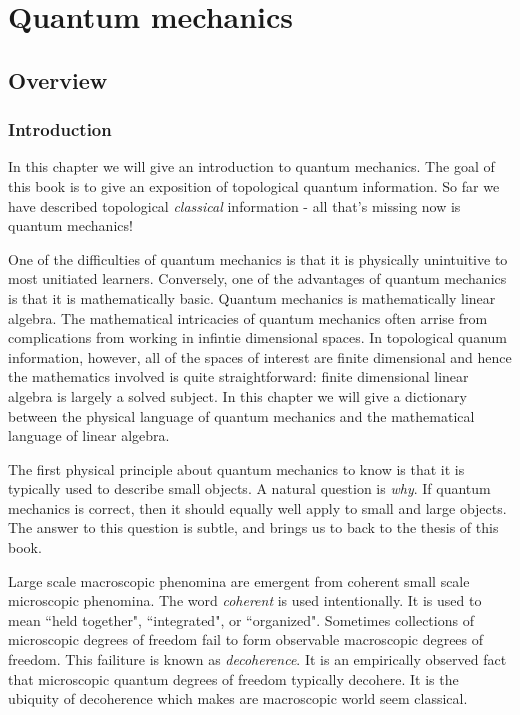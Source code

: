 \section{Quantum mechanics}
\label{quantum-mechanics}

\subsection{Overview}

\subsubsection{Introduction}

In this chapter we will give an introduction to quantum mechanics. The goal of this book is to give an exposition of topological quantum information. So far we have described topological {\em classical} information - all that's missing now is quantum mechanics!

One of the difficulties of quantum mechanics is that it is physically unintuitive to most unitiated learners. Conversely, one of the advantages of quantum mechanics is that it is mathematically basic. Quantum mechanics is mathematically linear algebra. The mathematical intricacies of quantum mechanics often arrise from complications from working in infintie dimensional spaces. In topological quanum information, however, all of the spaces of interest are finite dimensional and hence the mathematics involved is quite straightforward: finite dimensional linear algebra is largely a solved subject. In this chapter we will give a dictionary between the physical language of quantum mechanics and the mathematical language of linear algebra.

The first physical principle about quantum mechanics to know is that it is typically used to describe small objects. A natural question is {\em why}. If quantum mechanics is correct, then it should equally well apply to small and large objects. The answer to this question is subtle, and brings us to back to the thesis of this book.

Large scale macroscopic phenomina are emergent from coherent small scale microscopic phenomina. The word {\em coherent} is used intentionally. It is used to mean ``held together", ``integrated", or ``organized". Sometimes collections of microscopic degrees of freedom fail to form observable macroscopic degrees of freedom. This failiture is known as {\em decoherence}. It is an empirically observed fact that microscopic quantum degrees of freedom typically decohere.  It is the ubiquity of decoherence which makes are macroscopic world seem classical.

